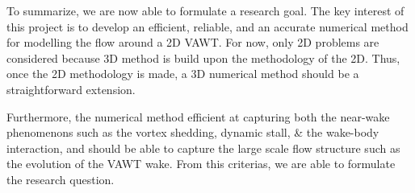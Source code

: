 


To summarize, we are now able to formulate a research goal. The key interest of this project is to develop an efficient, reliable, and an accurate numerical method for modelling the flow around a 2D VAWT. For now, only 2D problems are considered because 3D method is build upon the methodology of the 2D. Thus, once the 2D methodology is made, a 3D numerical method should be a straightforward extension.

Furthermore, the numerical method efficient at capturing both the near-wake phenomenons such as the vortex shedding, dynamic stall, \& the wake-body interaction, and should be able to capture the large scale flow structure such as the evolution of the VAWT wake. From this criterias, we are able to formulate the research question.

